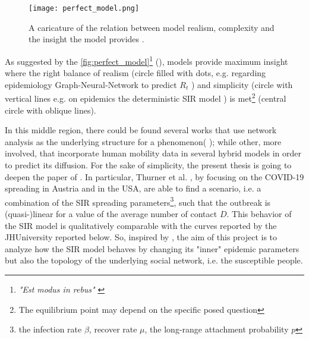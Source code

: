 \documentclass[a4paper,10pt,twoside]{book} %
\theoremstyle{definition}
\begin{document}
\begin{figure}[htbp]
	\centering
	\texttt{[image: perfect\_model.png]}
	\caption{A caricature of the relation between model realism, complexity and the
	insight the model provides \cite{Kiss::MathOfEpiOnNet}.}
	\label{fig:perfect_model}
\end{figure}	

As suggested by the \autoref{fig:perfect_model}\footnote{\textit{"Est modus in rebus"} \label{cit:GM}} (\cite{Kiss::Ch1MathOfEpiOnNet}), models provide maximum insight where the right balance of realism (circle filled with dots, e.g. regarding epidemiology Graph-Neural-Network to predict $R_t$ \cite{Davahli::USA_predicting_COVID19}) and simplicity (circle with vertical lines e.g. on epidemics the deterministic SIR model ) is met\footnote{The equilibrium point may depend on the specific posed question} (central circle with oblique lines).

In this middle region, there could be found several works that use network analysis as the underlying structure for a phenomenon(\cite{Thurner::NetBasedExpl} \cite{VespignaniSatorras2001Epidemic} \cite{pizzuti::2020_ItalyCOVIDnetwork}); while other, more involved, that incorporate human mobility data in several hybrid models \cite{ZEROUAL::DL_COVID19, Stubinger::Incidence_Diff_Countries} in order to predict its diffusion. For the sake of simplicity, the present thesis is going to deepen the paper of \cite{Thurner::NetBasedExpl}. In particular, Thurner et al. \cite{Thurner::NetBasedExpl}, by focusing on the COVID-19 spreading in Austria and in the USA, are able to find a scenario, i.e. a combination of the SIR spreading parameters\footnote{the infection rate $\beta$, recover rate $\mu$, the long-range attachment probability $p$}, such that the outbreak is (quasi-)linear for a value of the average number of contact $D$. This behavior of the SIR model is qualitatively comparable with the curves reported by the JHUniversity reported below. 
So, inspired by \cite{Thurner::NetBasedExpl}, the aim of this project is to analyze how the SIR model behaves by changing its "inner" epidemic parameters but also the topology of the underlying social network, i.e. the susceptible people.
\end{document}
